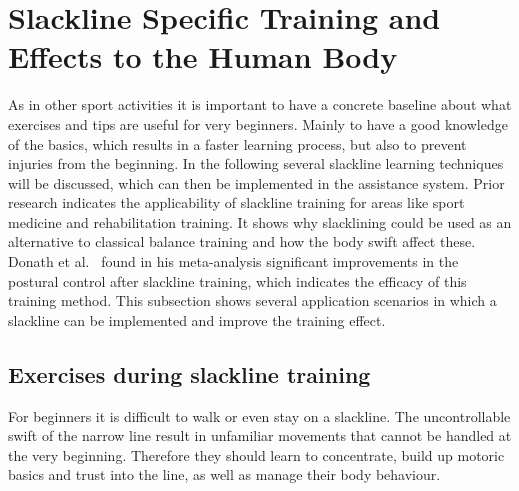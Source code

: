 \section{Slackline Specific Training and Effects to the Human Body}\label{2_2_slacklineTraining}

As in other sport activities it is important to have a concrete baseline about what exercises and tips are useful for very beginners. Mainly to have a good knowledge of the basics, which results in a faster learning process, but also to prevent injuries from the beginning. In the following several slackline learning techniques will be discussed, which can then be implemented in the assistance system. Prior research indicates the applicability of slackline training for areas like sport medicine and rehabilitation training. It shows why slacklining could be used as an alternative to classical balance training and how the body swift affect these. Donath et al.~\cite{Donath2016-rt} found in his meta-analysis significant improvements in the postural control after slackline training, which indicates the efficacy of this training method. This subsection shows several application scenarios in which a slackline can be implemented and improve the training effect.

\subsection{Exercises during slackline training}\label{2_1_1_slacklineTraining}

For beginners it is difficult to walk or even stay on a slackline. The uncontrollable swift of the narrow line result in unfamiliar movements that cannot be handled at the very beginning. Therefore they should learn to concentrate, build up motoric basics and trust into the line, as well as manage their body behaviour.

